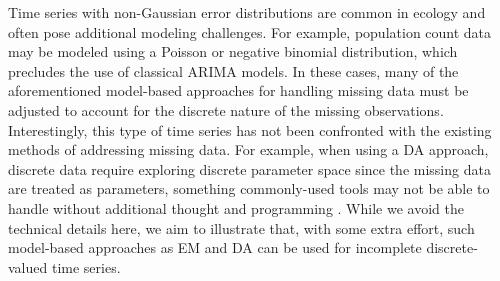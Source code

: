 \documentclass{article}
\begin{document}
Time series with non-Gaussian error distributions are common in ecology and often pose additional modeling challenges. For example, population count data may be modeled using a Poisson or negative binomial distribution, which precludes the use of classical ARIMA models. In these cases, many of the aforementioned model-based approaches for handling missing data must be adjusted to account for the discrete nature of the missing observations. Interestingly, this type of time series has not been confronted with the existing methods of addressing missing data. For example, when using a DA approach, discrete data require exploring discrete parameter space since the missing data are treated as parameters, something commonly-used tools may not be able to handle without additional thought and programming \citep[for example, STAN, a commonly-used software for fitting Bayesian models requires the user to marginalize over discrete parameters in their model specification;][]{carpenter_stan_2017}. While we avoid the technical details here, we aim to illustrate that, with some extra effort, such model-based approaches as EM and DA can be used for incomplete discrete-valued time series.

\end{document}
